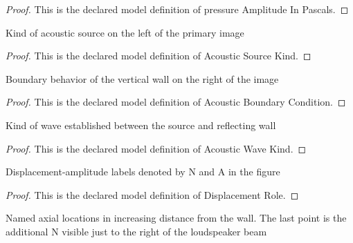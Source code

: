 \begin{proof}
  This is the declared model definition of pressure Amplitude In Pascals.
\end{proof}
\begin{definition}
  \label{def:physics:phyx-mini-0192:phyxminiproblems-problemphyxmini0192-acousticsourcekind}
  Kind of acoustic source on the left of the primary image
\end{definition}
\begin{proof}
  This is the declared model definition of Acoustic Source Kind.
\end{proof}
\begin{definition}
  \label{def:physics:phyx-mini-0192:phyxminiproblems-problemphyxmini0192-acousticboundarycondition}
  Boundary behavior of the vertical wall on the right of the image
\end{definition}
\begin{proof}
  This is the declared model definition of Acoustic Boundary Condition.
\end{proof}
\begin{definition}
  \label{def:physics:phyx-mini-0192:phyxminiproblems-problemphyxmini0192-acousticwavekind}
  Kind of wave established between the source and reflecting wall
\end{definition}
\begin{proof}
  This is the declared model definition of Acoustic Wave Kind.
\end{proof}
\begin{definition}
  \label{def:physics:phyx-mini-0192:phyxminiproblems-problemphyxmini0192-displacementrole}
  Displacement-amplitude labels denoted by N and A in the figure
\end{definition}
\begin{proof}
  This is the declared model definition of Displacement Role.
\end{proof}
\begin{definition}
  \label{def:physics:phyx-mini-0192:phyxminiproblems-problemphyxmini0192-figurepoint}
  Named axial locations in increasing distance from the wall. The last point is the additional N visible just to the right of the loudspeaker beam
\end{definition}
